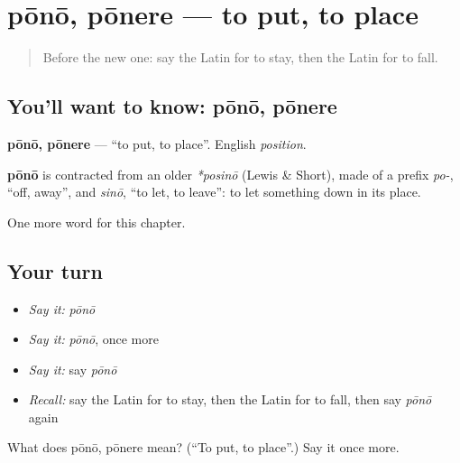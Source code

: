 \section[pōnō, pōnere]{pōnō, pōnere — to put, to place}

\label{lesson:LA-C77-pono}



\begin{quote}
Before the new one: say the Latin for to stay, then the Latin for to fall.
\end{quote}

\subsection*{You'll want to know: pōnō, pōnere}
\textbf{pōnō, pōnere} — \textquotedblleft{}to put, to place\textquotedblright{}. English \emph{position}.

\begin{cousinweb}
\textbf{pōnō} is contracted from an older \emph{*posinō} (Lewis \& Short), made of a prefix \emph{po-}, \textquotedblleft{}off, away\textquotedblright{}, and \emph{sinō}, \textquotedblleft{}to let, to leave\textquotedblright{}: to let something down in its place.
\end{cousinweb}

\begin{grammarlens}[title={What you've built}]
One more word for this chapter.
\end{grammarlens}

\subsection*{Your turn}
\begin{itemize}
\raggedright
  \item \emph{Say it:} \emph{pōnō}
  \item \emph{Say it:} \emph{pōnō}, once more
  \item \emph{Say it:} say \emph{pōnō}
  \item \emph{Recall:} say the Latin for to stay, then the Latin for to fall, then say \emph{pōnō} again
\end{itemize}

\begin{tcolorbox}[breakable,colback=teal!4,colframe=teal!35!black,title={Before you move on}]
What does pōnō, pōnere mean? (\textquotedblleft{}To put, to place\textquotedblright{}.) Say it once more.
\end{tcolorbox}
